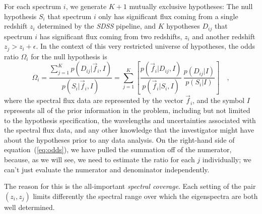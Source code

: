 \documentclass[12pt]{article}
\newcommand{\facility}[1]{\textsl{#1}}
\newcommand{\equationname}[1]{equation~(\ref{#1})}
\newcommand{\fluxvec}{\vec{f}}
\begin{document}
For each spectrum $i$, we generate $K+1$ mutually exclusive hypotheses:
The null hypothesis $S_i$ that spectrum $i$ only has significant flux
coming from a single redshift $z_i$ determined by the \facility{SDSS}
pipeline, and $K$ hypotheses $D_{ij}$ that spectrum $i$ has significant
flux coming from two redshifts, $z_i$ and another redshift
$z_j>z_i+\epsilon$.  In the context of this very restricted universe
of hypotheses, the odds ratio $\Omega_i$ for the null hypothesis is
\begin{equation}\label{eq:odds}
\Omega_i = \frac{\sum_{j=1}^K p(D_{ij}|\fluxvec_i,I)}{p(S_i|\fluxvec_i,I)}
 = \sum_{j=1}^K \left[\frac{p(\fluxvec_i|D_{ij},I)}{p(\fluxvec_i|S_i,I)}
 \,\frac{p(D_{ij}|I)}{p(S_i|I)}\right] \quad,
\end{equation}
where the spectral flux data are represented by the vector
$\fluxvec_i$, and the symbol $I$ represents all of the prior
information in the problem, including but not limited to the
hypothesis specification, the wavelengths and uncertainties associated
with the spectral flux data, and any other knowledge that the
investigator might have about the hypotheses prior to any data
analysis.  On the right-hand side of \equationname{eq:odds}, we have
pulled the summation off of the numerator, because, as we will see, we
need to estimate the ratio for each $j$ individually; we can't just
evaluate the numerator and denominator independently.

The reason for this is the all-important \emph{spectral coverage}.
Each setting of the pair $(z_i,z_j)$ limits differently the spectral
range over which the eigenspectra are both well determined.
\end{document}
